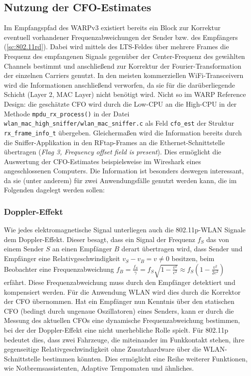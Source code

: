 \documentclass[letterpaper,11pt]{article}
\begin{document}
\begin{onehalfspace}
\subsection{Nutzung der
CFO-Estimates}\label{nutzung-der-cfo-estimates}

Im Empfangspfad des WARPv3 existiert bereits ein Block zur Korrektur
eventuell vorhandener Frequenzabweichungen der Sender bzw. des
Empfängers (\autoref{sc:802.11rd}). Dabei wird
mittels des LTS-Feldes über mehrere Frames die Frequenz des empfangenen
Signals gegenüber der Center-Frequenz des gewählten Channels bestimmt
und anschließend zur Korrektur der Fourier-Transformation der einzelnen
Carriers genutzt.
In den meisten kommerziellen WiFi-Transceivern wird die Informationen
anschließend verworfen, da sie für die darüberliegende Schicht (Layer 2,
MAC Layer) nicht benötigt wird. Nicht so im WARP Reference Design: die
geschätzte CFO wird durch die Low-CPU an die High-CPU in der Methode
\texttt{mpdu\_rx\_process()} in der Datei
\texttt{wlan\_mac\_high\_sniffer/wlan\_mac\_sniffer.c} als Feld
\texttt{cfo\_est} der Struktur \texttt{rx\_frame\_info\_t} übergeben.
Gleichermaßen wird die Information bereits durch die Sniffer-Applikation
in den RFtap-Frames an die Ethernet-Schnittstelle übertragen (\emph{Flag
3, Frequency offset field is present}). Dies ermöglicht die Auswertung
der CFO-Estimates beispielsweise im Wireshark eines angeschlossenen
Computers.
Die Information ist besonders deswegen interessant, da sie (unter
anderem) für zwei Anwendungsfälle genutzt werden kann, die im Folgenden
dagelegt werden sollen:

\subsubsection{Doppler-Effekt}\label{doppler-effekt}

Wie jedes elektromagnetische Signal unterliegen auch die 802.11p-WLAN
Signale dem Doppler-Effekt. Dieser besagt, dass ein Signal der Frequenz
\(f_S\) das von einem Sender \(S\) an einen Empfänger \(B\) derart
übertragen wird, dass Sender und Empfänger eine Relativgeschwindigkeit
\(v_S - v_B = v \neq 0\) besitzen, beim Beobachter eine
Frequenzabweichung
\(f_{B} = \frac{f_{S}}{\gamma} = f_{S} \sqrt{1-\frac{v^2}{c^2}} \approx f_{S} \left(1 - \frac{v^2}{2c^2}\right)\)
erfährt.
Diese Frequenzabweichung muss durch den Empfänger detektiert und
kompensiert werden. Für die Anwendung WLAN wird dies durch die Korrektor
der CFO übernommen. Hat ein Empfänger nun Kenntnis über den statischen
CFO (bedingt durch ungenaue Oszillatoren) eines Senders, kann er durch
die Messung des aktuellen CFOs eine dynamische Frequenzabweichung
bestimmen, bei der der Doppler-Effekt eine nicht unerhebliche Rolle
spielt. Für 802.11p bedeutet dies, dass zwei Fahrzeuge, die miteinander
im Funkkontakt stehen, ihre gegenseitige Relativgeschwindigkeit ohne
Zusatzhardware über die WLAN-Schnittstelle bestimmen könnten. Dies
ermöglicht eine Reihe weiterer Funktionen, wie Notbremsassistenten,
Adaptive Tempomaten und ähnliches.


\end{onehalfspace}
\end{document}
